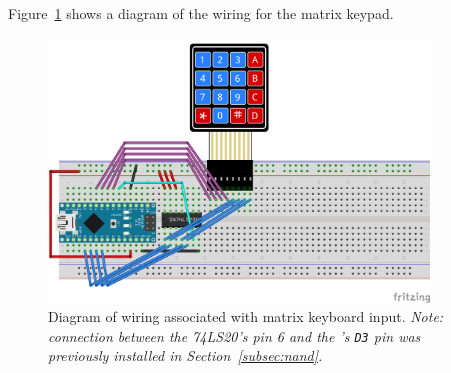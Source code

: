 Figure~\ref{fig:keypad-diagram} shows a diagram of the wiring for the matrix keypad.

\begin{figure}%
    \centering
    \includegraphics[width=0.9\textwidth]{fritzing_diagrams/keypad}
    \caption{Diagram of wiring associated with matrix keyboard input.
        \textit{Note: connection between the 74LS20's pin 6 and the \developmentboard's
        \texttt{D3} pin was previously installed in Section~\ref{subsec:nand}.}
        \label{fig:keypad-diagram}}
\end{figure}

\disconnect\

